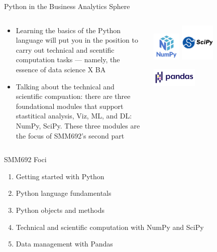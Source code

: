\documentclass[aspectratio=1610]{beamer}
\begin{document}
\begin{frame}[c]{Python in the Business Analytics Sphere}

	\begin{columns}[c]
		\begin{column}{0.5\textwidth}

			\begin{itemize}
				\item Learning the basics of the Python language will put you in the position to carry out technical and scentific computation tasks --- namely, the essence of data science X BA
				\item Talking about the technical and scientific compuation: there are three foundational modules that support stastitical analysis, Viz, ML, and DL: NumPy, SciPy. These three modules are the focus of SMM692's second part
			\end{itemize}
		\end{column}
		\begin{column}{0.5\textwidth}
			\centering
			\includegraphics[width=0.25\textwidth]{images/numpy.png}
			\includegraphics[width=0.3\textwidth]{images/scipy.png}

			\includegraphics[width=0.4\textwidth]{images/pandas.png}
		\end{column}
	\end{columns}
\end{frame}

\begin{frame}{SMM692 Foci}
	\begin{enumerate}
		\item Getting started with Python
		\item Python language fundamentals
		\item Python objects and methods
		\item Technical and scientific computation with NumPy and SciPy
		\item Data management with Pandas
	\end{enumerate}
\end{frame}
\end{document}
